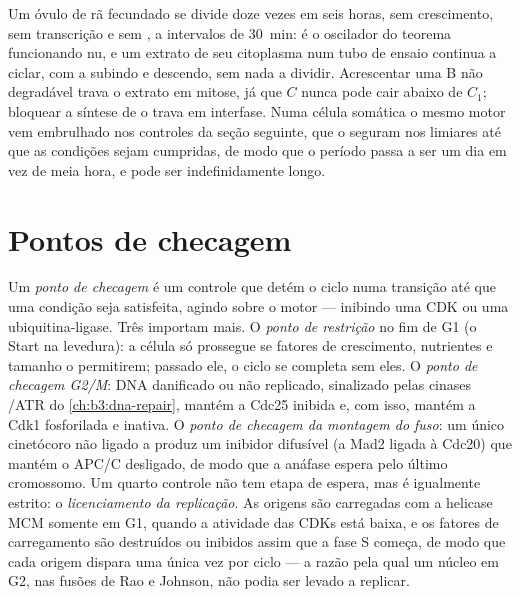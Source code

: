 \begin{example}\label{ex:b3:cell-cycle-apoptosis:frog}
Um óvulo de rã fecundado se divide doze vezes em seis horas, sem
crescimento, sem transcrição e sem , a intervalos de
\qty{30}{min}: é o oscilador do teorema funcionando nu, e um extrato de
seu citoplasma num tubo de ensaio continua a ciclar, com a 
subindo e descendo, sem nada a dividir. Acrescentar uma  B não
degradável trava o extrato em mitose, já que $C$ nunca pode cair abaixo
de $C_{1}$; bloquear a síntese de  o trava em interfase. Numa
célula somática o mesmo motor vem embrulhado nos controles da seção
seguinte, que o seguram nos limiares até que as condições sejam
cumpridas, de modo que o período passa a ser um dia em vez de meia
hora, e pode ser indefinidamente longo.
\end{example}

\section{Pontos de checagem}

\begin{definition}\label{def:b3:cell-cycle-apoptosis:checkpoints}
Um \emph{ponto de checagem} é um controle que detém o ciclo numa
transição até que uma condição seja satisfeita, agindo sobre o motor
--- inibindo uma CDK ou uma ubiquitina-ligase. Três importam mais. O
\emph{ponto de restrição} no fim de G1 (o Start na levedura): a célula
só prossegue se fatores de crescimento, nutrientes e tamanho o
permitirem; passado ele, o ciclo se completa sem eles. O \emph{ponto de
checagem G2/M}: DNA danificado ou não replicado, sinalizado pelas
cinases /ATR do \cref{ch:b3:dna-repair}, mantém a Cdc25 inibida e,
com isso, mantém a Cdk1 fosforilada e inativa. O \emph{ponto de
checagem da montagem do fuso}: um único cinetócoro não ligado a
 produz um inibidor difusível (a Mad2 ligada à Cdc20) que
mantém o APC/C desligado, de modo que a anáfase espera pelo último
cromossomo. Um quarto controle não tem etapa de espera, mas é
igualmente estrito: o \emph{licenciamento da replicação}. As origens
são carregadas com a helicase MCM somente em G1, quando a atividade das
CDKs está baixa, e os fatores de carregamento são destruídos ou
inibidos assim que a fase S começa, de modo que cada origem dispara uma
única vez por ciclo --- a razão pela qual um núcleo em G2, nas fusões
de Rao e Johnson, não podia ser levado a replicar.
\end{definition}

